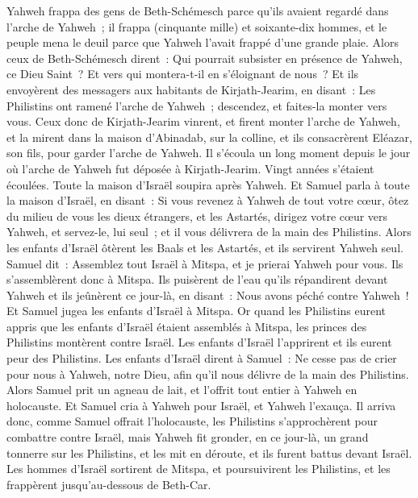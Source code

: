 \begin{multicols}{2}
Yahweh frappa des gens de Beth-Schémesch parce qu'ils avaient regardé dans l'arche de Yahweh~; il frappa (cinquante mille) et soixante-dix hommes, et le peuple mena le deuil parce que Yahweh l'avait frappé d'une grande plaie.
Alors ceux de Beth-Schémesch dirent~: Qui pourrait subsister en présence de Yahweh, ce Dieu Saint~? Et vers qui montera-t-il en s'éloignant de nous~?
Et ils envoyèrent des messagers aux habitants de Kirjath-Jearim, en disant~: Les Philistins ont ramené l'arche de Yahweh~; descendez, et faites-la monter vers vous.
\VerseOne{}Ceux donc de Kirjath-Jearim vinrent, et firent monter l'arche de Yahweh, et la mirent dans la maison d'Abinadab, sur la colline, et ils consacrèrent Eléazar, son fils, pour garder l'arche de Yahweh.
Il s'écoula un long moment depuis le jour où l'arche de Yahweh fut déposée à Kirjath-Jearim. Vingt années s'étaient écoulées. Toute la maison d'Israël soupira après Yahweh.
Et Samuel parla à toute la maison d'Israël, en disant~: Si vous revenez à Yahweh de tout votre cœur, ôtez du milieu de vous les dieux étrangers, et les Astartés, dirigez votre cœur vers Yahweh, et servez-le, lui seul~; et il vous délivrera de la main des Philistins.
Alors les enfants d'Israël ôtèrent les Baals et les Astartés, et ils servirent Yahweh seul.
Samuel dit~: Assemblez tout Israël à Mitspa, et je prierai Yahweh pour vous.
Ils s'assemblèrent donc à Mitspa. Ils puisèrent de l'eau qu'ils répandirent devant Yahweh et ils jeûnèrent ce jour-là, en disant~: Nous avons péché contre Yahweh~! Et Samuel jugea les enfants d'Israël à Mitspa.
Or quand les Philistins eurent appris que les enfants d'Israël étaient assemblés à Mitspa, les princes des Philistins montèrent contre Israël. Les enfants d'Israël l'apprirent et ils eurent peur des Philistins.
Les enfants d'Israël dirent à Samuel~: Ne cesse pas de crier pour nous à Yahweh, notre Dieu, afin qu'il nous délivre de la main des Philistins.
Alors Samuel prit un agneau de lait, et l'offrit tout entier à Yahweh en holocauste. Et Samuel cria à Yahweh pour Israël, et Yahweh l'exauça.
Il arriva donc, comme Samuel offrait l'holocauste, les Philistins s'approchèrent pour combattre contre Israël, mais Yahweh fit gronder, en ce jour-là, un grand tonnerre sur les Philistins, et les mit en déroute, et ils furent battus devant Israël.
Les hommes d'Israël sortirent de Mitspa, et poursuivirent les Philistins, et les frappèrent jusqu'au-dessous de Beth-Car.

\end{multicols}
